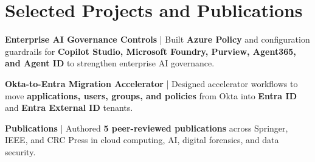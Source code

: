 \documentclass[a4paper,3pt]{article}
\begin{document}
\section{Selected Projects and Publications}

\begin{minipage}[t]{\linewidth}
    \textbf{Enterprise AI Governance Controls} | Built \textbf{Azure Policy} and configuration guardrails for \textbf{Copilot Studio, Microsoft Foundry, Purview, Agent365, and Agent ID} to strengthen enterprise AI governance.
\end{minipage}



\begin{minipage}[t]{\linewidth}
    \textbf{Okta-to-Entra Migration Accelerator} | Designed accelerator workflows to move \textbf{applications, users, groups, and policies} from Okta into \textbf{Entra ID} and \textbf{Entra External ID} tenants.
\end{minipage}

\begin{minipage}[t]{\linewidth}
    \textbf{Publications} | Authored \textbf{5 peer-reviewed publications} across Springer, IEEE, and CRC Press in cloud computing, AI, digital forensics, and data security.
\end{minipage}
\end{document}

